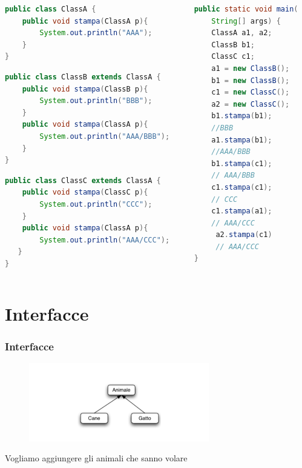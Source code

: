 \documentclass{beamer}
\begin{document}
\begin{frame}[fragile]
\begin{columns}
\begin{column}{0.6\textwidth}
\begin{lstlisting}[language=Java,escapechar=|]
public class ClassA {
    public void stampa(ClassA p){
        System.out.println("AAA");
    }
}
\end{lstlisting}
\begin{lstlisting}[language=Java,escapechar=|]
public class ClassB extends ClassA {
    public void stampa(ClassB p){
        System.out.println("BBB");
    }
    public void stampa(ClassA p){
        System.out.println("AAA/BBB");
    }
}
\end{lstlisting}
\begin{lstlisting}[language=Java,escapechar=|]
public class ClassC extends ClassA {
    public void stampa(ClassC p){
        System.out.println("CCC");
    }
    public void stampa(ClassA p){
        System.out.println("AAA/CCC");
   }
}
\end{lstlisting}
\end{column}
\begin{column}{0.4\textwidth}
\begin{lstlisting}[language=Java,escapechar=|]
public static void main(
    String[] args) {
    ClassA a1, a2;
    ClassB b1;
    ClassC c1;
    a1 = new ClassB();
    b1 = new ClassB();
    c1 = new ClassC();
    a2 = new ClassC();
    b1.stampa(b1); 
    //BBB
    a1.stampa(b1);  
    //AAA/BBB
    b1.stampa(c1); 
    // AAA/BBB
    c1.stampa(c1); 
    // CCC
    c1.stampa(a1); 
    // AAA/CCC
     a2.stampa(c1) 
     // AAA/CCC
}
\end{lstlisting}
\end{column}
\end{columns}
\end{frame}





\section{Interfacce}
\begin{frame}[fragile]
\frametitle{Interfacce}
\begin{figure}[h!]
  \centering
    \includegraphics[width=0.7\textwidth]{gerarchia.pdf}
\end{figure}
Vogliamo aggiungere gli animali che sanno volare
\end{frame}
\end{document}
